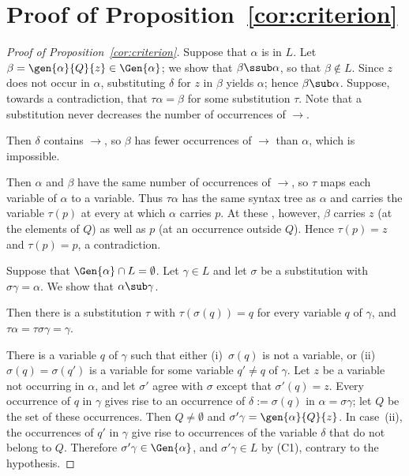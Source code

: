 \section{Proof of Proposition~\ref{cor:criterion}}\label{app:criterion}

\begin{proof}[Proof of Proposition~\ref{cor:criterion}]
Suppose that $\alpha$ is  in $L$. Let $\beta=\gen{\alpha}{Q}{z}\in\Gen{\alpha}$; we show that $\beta\ssub\alpha$, so that $\beta\notin L$. Since $z$ does not occur in $\alpha$, substituting $\delta$ for $z$ in
$\beta$ yields $\alpha$; hence $\beta\sub\alpha$. Suppose, towards a
contradiction, that $\tau\alpha=\beta$ for some substitution $\tau$. Note
that a substitution never decreases the number of occurrences of $\to$.

Then $\delta$ contains $\to$, so $\beta$ has
fewer occurrences of $\to$ than $\alpha$, which is impossible.

Then $\alpha$ and $\beta$ have the same
number of occurrences of $\to$, so $\tau$ maps each variable of $\alpha$
to a variable. Thus $\tau\alpha$ has the same syntax tree as $\alpha$ and
carries the variable $\tau(p)$ at every  at which $\alpha$ carries $p$.
At these , however, $\beta$ carries $z$ (at the elements of $Q$) as
well as $p$ (at an occurrence outside $Q$). Hence $\tau(p)=z$ and
$\tau(p)=p$, a contradiction.

Suppose that $\Gen{\alpha}\cap L=\emptyset$. Let $\gamma\in L$ and let $\sigma$ be a substitution with
$\sigma\gamma=\alpha$. We show that $\alpha\sub\gamma$.

Then there is a substitution $\tau$ with $\tau(\sigma(q))=q$ for
every variable $q$ of $\gamma$, and $\tau\alpha=\tau\sigma\gamma=\gamma$.

There is a variable $q$ of $\gamma$ such that either
(i)~$\sigma(q)$ is not a variable, or (ii)~$\sigma(q)=\sigma(q')$ is a
variable for some variable $q'\ne q$ of $\gamma$. Let $z$ be a variable not
occurring in $\alpha$, and let $\sigma'$ agree with $\sigma$ except that
$\sigma'(q)=z$. Every occurrence of $q$ in $\gamma$ gives rise to an
occurrence of $\delta:=\sigma(q)$ in $\alpha=\sigma\gamma$; let $Q$ be the
set of these occurrences. Then $Q\ne\emptyset$ and
$\sigma'\gamma=\gen{\alpha}{Q}{z}$. In case~(ii), the occurrences of $q'$ in
$\gamma$ give rise to occurrences of the variable $\delta$ that do not
belong to $Q$. Therefore $\sigma'\gamma\in\Gen{\alpha}$, and $\sigma'\gamma\in L$ by (C1), contrary to the hypothesis.
\end{proof}
